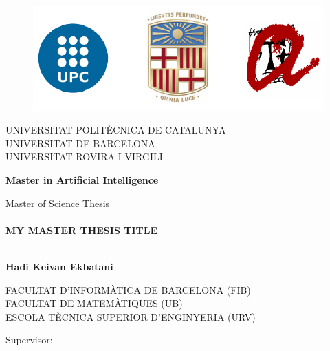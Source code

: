 \begin{titlepage}
	
	\begin{figure}[t]
		\centering
		\includegraphics[scale=0.8]{images/upc_ub_urv}
	\end{figure}    
	
	
	\begin{center}
		
		{\large \uppercase{Universitat politècnica de Catalunya}} \medskip \\
		{\large \uppercase{Universitat de Barcelona}} \medskip \\
		{\large \uppercase{Universitat Rovira i Virgili}} \medskip \\
		\vspace*{1cm}
		\begin{center}
			\Large	\bf   Master in Artificial Intelligence
		\end{center}
		

		{\Large Master of Science Thesis} \vspace*{1.0cm} \\
		\HRule \\[0.4cm]
		{ \huge \bfseries MY MASTER THESIS TITLE }\\[0.4cm] %

		\HRule \\[1.cm]
	\end{center}

	
	\thispagestyle{empty}
	\begin{center}
	\Large	\bf Hadi Keivan Ekbatani\\
	\end{center}
	\begin{center}
		{\large \uppercase{Facultat d'informàtica de Barcelona (FIB)}} \medskip \\
		{\large \uppercase{Facultat de Matemàtiques (UB)}} \medskip \\
		{\large \uppercase{Escola tècnica superior d'enginyeria (URV)}} \medskip \\
	\end{center}
	\vspace*{1.cm}
	\begin{center} 
		\begin{multicols}{2}	
		{\large Supervisor:}
		

\end{multicols}
\end{center}
\end{titlepage}

